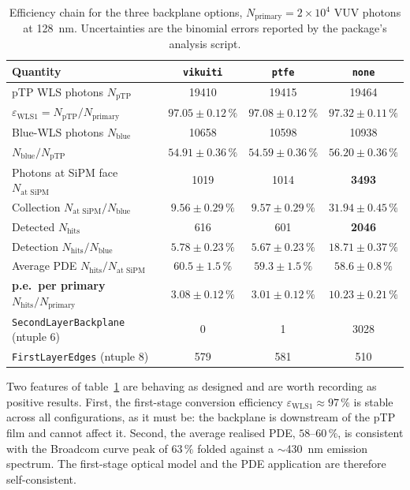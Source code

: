 \documentclass[a4paper,11pt]{article}
\begin{document}
\begin{table}[htbp]
\centering
\caption{\label{tab:eff}Efficiency chain for the three backplane options,
$N_{\text{primary}}=2\times10^{4}$ VUV photons at \SI{128}{\nano\meter}.
Uncertainties are the binomial errors reported by the package's analysis script.}
\begin{tabular}{lccc}
\toprule
Quantity & \texttt{vikuiti} & \texttt{ptfe} & \texttt{none} \\
\midrule
pTP WLS photons $N_{\text{pTP}}$        & 19410 & 19415 & 19464 \\
$\varepsilon_{\text{WLS1}}=N_{\text{pTP}}/N_{\text{primary}}$
  & $97.05\pm0.12\,\%$ & $97.08\pm0.12\,\%$ & $97.32\pm0.11\,\%$ \\
Blue-WLS photons $N_{\text{blue}}$      & 10658 & 10598 & 10938 \\
$N_{\text{blue}}/N_{\text{pTP}}$
  & $54.91\pm0.36\,\%$ & $54.59\pm0.36\,\%$ & $56.20\pm0.36\,\%$ \\
\midrule
Photons at SiPM face $N_{\text{at SiPM}}$ & 1019 & 1014 & \textbf{3493} \\
Collection $N_{\text{at SiPM}}/N_{\text{blue}}$
  & $9.56\pm0.29\,\%$ & $9.57\pm0.29\,\%$ & $\mathbf{31.94\pm0.45\,\%}$ \\
Detected $N_{\text{hits}}$              & 616 & 601 & \textbf{2046} \\
Detection $N_{\text{hits}}/N_{\text{blue}}$
  & $5.78\pm0.23\,\%$ & $5.67\pm0.23\,\%$ & $\mathbf{18.71\pm0.37\,\%}$ \\
Average PDE $N_{\text{hits}}/N_{\text{at SiPM}}$
  & $60.5\pm1.5\,\%$ & $59.3\pm1.5\,\%$ & $58.6\pm0.8\,\%$ \\
\midrule
\textbf{p.e.\ per primary} $N_{\text{hits}}/N_{\text{primary}}$
  & $\mathbf{3.08\pm0.12\,\%}$ & $\mathbf{3.01\pm0.12\,\%}$ & $\mathbf{10.23\pm0.21\,\%}$ \\
\midrule
\texttt{SecondLayerBackplane} (ntuple 6) & 0 & 1 & 3028 \\
\texttt{FirstLayerEdges} (ntuple 8)      & 579 & 581 & 510 \\
\bottomrule
\end{tabular}
\end{table}

Two features of table~\ref{tab:eff} are behaving as designed and are worth
recording as positive results. First, the first-stage conversion efficiency
$\varepsilon_{\text{WLS1}}\approx97\,\%$ is stable across all configurations, as
it must be: the backplane is downstream of the pTP film and cannot affect it.
Second, the average realised PDE, $58$--$60\,\%$, is consistent with the
Broadcom curve peak of $63\,\%$ folded against a $\sim$\SI{430}{\nano\meter}
emission spectrum. The first-stage optical model and the PDE application are
therefore self-consistent.
\end{document}
